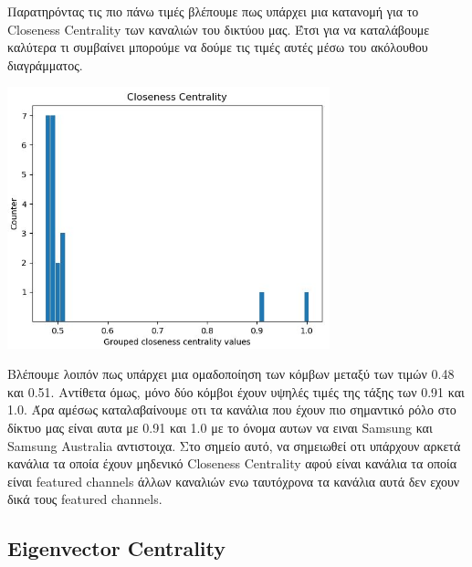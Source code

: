 \documentclass[12pt]{article}
\begin{document}
	\newpage
	Παρατηρόντας τις πιο πάνω τιμές βλέπουμε πως υπάρχει μια κατανομή για το Closeness Centrality των καναλιών του δικτύου μας. Έτσι για να καταλάβουμε καλύτερα τι συμβαίνει μπορούμε να δούμε τις τιμές αυτές μέσω του ακόλουθου διαγράμματος.
	\vspace{12pt}
	
	\begin{center}
		\includegraphics[width=0.7\textwidth]{photos-files/section7/bar_chart_for_7.3.JPG}
	\end{center}
	Βλέπουμε λοιπόν πως υπάρχει μια ομαδοποίηση των κόμβων μεταξύ των τιμών 0.48 και 0.51. Αντίθετα όμως, μόνο δύο κόμβοι έχουν υψηλές τιμές της τάξης των 0.91 και 1.0. Άρα αμέσως καταλαβαίνουμε οτι τα κανάλια που έχουν πιο σημαντικό ρόλο στο δίκτυο μας είναι αυτα με 0.91 και 1.0 με το όνομα αυτων να ειναι Samsung και Samsung Australia αντιστοιχα. Στο σημείο αυτό, να σημειωθεί οτι υπάρχουν αρκετά κανάλια τα οποία έχουν μηδενικό Closeness Centrality αφού είναι κανάλια τα οποία είναι featured channels άλλων καναλιών ενω ταυτόχρονα τα κανάλια αυτά δεν εχουν δικά τους featured channels.
	
	
	\newpage
	\subsection{Eigenvector Centrality}
	
	
	
	\label{chap:centrality_measures_7}
	
	
	
\end{document}
